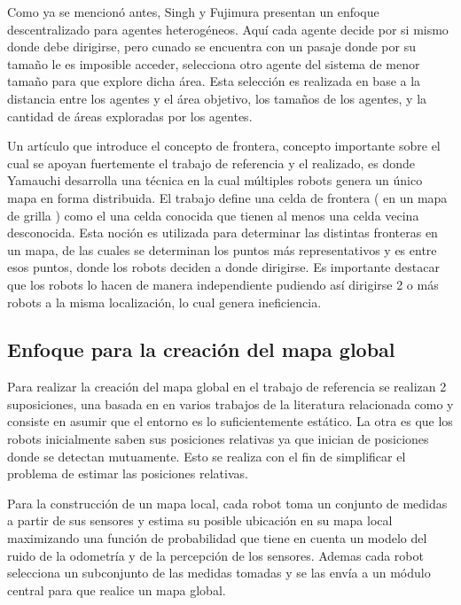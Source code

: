\documentclass[runningheads]{llncs}
\begin{document}
Como ya se mencionó antes, Singh y Fujimura \cite{otro} presentan un enfoque descentralizado para agentes heterogéneos. Aquí cada agente decide por si mismo donde debe dirigirse, pero cunado se encuentra con un pasaje donde por su tamaño le es imposible acceder, selecciona otro agente del sistema de menor tamaño para que explore dicha área. Esta selección es realizada en base a la distancia entre los agentes y el área objetivo, los tamaños de los agentes, y la cantidad de áreas exploradas por los agentes.

Un artículo que introduce el concepto de frontera, concepto importante sobre el cual se apoyan fuertemente el trabajo de referencia y el realizado, es \cite{Yama} donde Yamauchi desarrolla una técnica en la cual múltiples robots genera un único mapa en forma distribuida. El trabajo define una celda de frontera ( en un mapa de grilla ) como el una celda conocida que tienen al menos una celda vecina desconocida. Esta noción es utilizada para determinar las distintas fronteras en un mapa, de las cuales se determinan los puntos más representativos y es entre esos puntos, donde los robots deciden a donde dirigirse. Es importante destacar que los robots lo hacen de manera independiente pudiendo así dirigirse 2 o más robots a la misma localización, lo cual genera ineficiencia.

\subsection{Enfoque para la creación del mapa global}

Para realizar la creación del mapa global en el trabajo de referencia se realizan 2 suposiciones, una basada en en varios trabajos de la literatura relacionada como \cite{thrun, leo, choset} y consiste en asumir que el entorno es lo suficientemente estático. La otra es que los robots inicialmente saben sus posiciones relativas ya que inician de posiciones donde se detectan mutuamente. Esto se realiza con el fin de simplificar el problema de estimar las posiciones relativas.

Para la construcción de un mapa local, cada robot toma un conjunto de medidas a partir de sus sensores y estima su posible ubicación en su mapa local maximizando una función de probabilidad que tiene en cuenta un modelo del ruido de la odometría y de la percepción de los sensores. Ademas cada robot selecciona un subconjunto de las medidas tomadas y se las envía a un módulo central para que realice un mapa global. 
\end{document}
